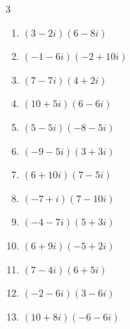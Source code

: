 \begin{multicols}{3}
\begin{enumerate}
  \item $\displaystyle (3-2i)(6-8i)$

        \phantom{$\displaystyle =2-36i$}

  \item $\displaystyle (-1-6i)(-2+10i)$

        \phantom{$\displaystyle =62+2i$}

  \item $\displaystyle (7-7i)(4+2i)$

        \phantom{$\displaystyle =42-14i$}

  \item $\displaystyle (10+5i)(6-6i)$

        \phantom{$\displaystyle =90-30i$}

  \item $\displaystyle (5-5i)(-8-5i)$

        \phantom{$\displaystyle =-65+15i$}

  \item $\displaystyle (-9-5i)(3+3i)$

        \phantom{$\displaystyle =-12-42i$}

  \item $\displaystyle (6+10i)(7-5i)$

        \phantom{$\displaystyle =92+40i$}

  \item $\displaystyle (-7+i)(7-10i)$

        \phantom{$\displaystyle =-39+77i$}

  \item $\displaystyle (-4-7i)(5+3i)$

        \phantom{$\displaystyle =1-47i$}

  \item $\displaystyle (6+9i)(-5+2i)$

        \phantom{$\displaystyle =-48-33i$}

  \item $\displaystyle (7-4i)(6+5i)$

        \phantom{$\displaystyle =62+11i$}

  \item $\displaystyle (-2-6i)(3-6i)$

        \phantom{$\displaystyle =-42-6i$}

  \item $\displaystyle (10+8i)(-6-6i)$

        \phantom{$\displaystyle =-12-108i$}


\end{enumerate}
\end{multicols}
